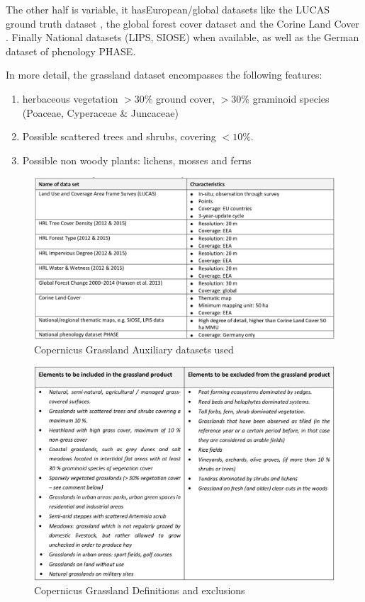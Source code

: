 \documentclass[a4paper,11.5pt,onecolumn]{article}
\begin{document}
\noindent The other half is variable, it hasEuropean/global datasets like the LUCAS ground truth dataset \citep{lucas2019}, the global forest cover dataset \citep{hansen2013high} and the Corine Land Cover \citep{corine2019}. Finally National datasets (LIPS, SIOSE) when available, as well as the German dataset of phenology PHASE.\newline\linebreak

\noindent In more detail, the grassland dataset encompasses the following features:
\begin{enumerate}
\item herbaceous vegetation $> 30\%$ ground cover, $> 30\%$ graminoid
species (Poaceae, Cyperaceae \& Juncaceae)
\item Possible scattered trees and shrubs, covering $< 10 \%$.
\item Possible non woody plants: lichens, mosses and ferns
\end{enumerate}

\begin{figure}[htbp]
\includegraphics[width=\textwidth]{images/grassland2015auxdatasets.png}
\caption{Copernicus Grassland Auxiliary datasets used}
\label{fig3}
\end{figure}

\begin{figure}[htbp]
\includegraphics[width=\textwidth]{images/grasslanddefns.png}
\caption{Copernicus Grassland Definitions and exclusions}
\label{fig4}
\end{figure}
\end{document}
